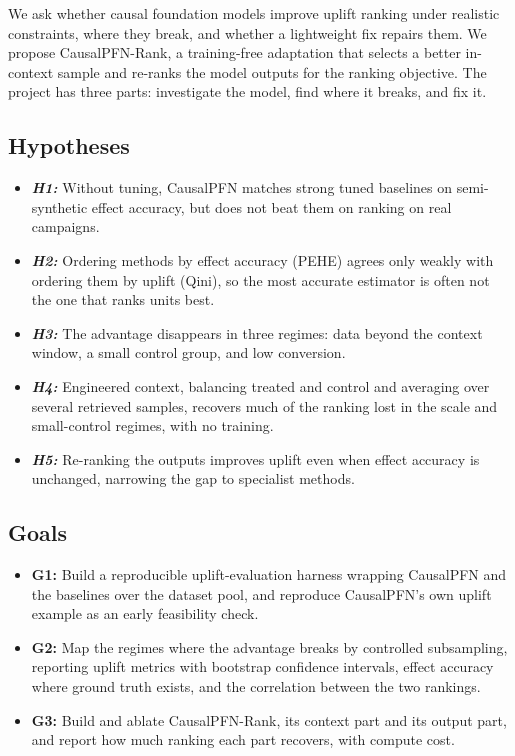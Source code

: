 \documentclass[twocolumn]{style}
\begin{document}
We ask whether causal foundation models improve uplift ranking under realistic constraints, where
they break, and whether a lightweight fix repairs them. We propose CausalPFN-Rank, a training-free
adaptation that selects a better in-context sample and re-ranks the model outputs for the ranking
objective. The project has three parts: investigate the model, find where it breaks, and fix it.

\subsection{Hypotheses}
\begin{itemize}
    \item \textit{\textbf{H1:}} Without tuning, CausalPFN matches strong tuned baselines on
    semi-synthetic effect accuracy, but does not beat them on ranking on real campaigns.
    \item \textit{\textbf{H2:}} Ordering methods by effect accuracy (PEHE) agrees only weakly with
    ordering them by uplift (Qini), so the most accurate estimator is often not the one that ranks
    units best.
    \item \textit{\textbf{H3:}} The advantage disappears in three regimes: data beyond the context
    window, a small control group, and low conversion.
    \item \textit{\textbf{H4:}} Engineered context, balancing treated and control and averaging over
    several retrieved samples, recovers much of the ranking lost in the scale and small-control
    regimes, with no training.
    \item \textit{\textbf{H5:}} Re-ranking the outputs improves uplift even when effect accuracy is
    unchanged, narrowing the gap to specialist methods.
\end{itemize}

\subsection{Goals}
\begin{itemize}
    \item \textbf{G1:} Build a reproducible uplift-evaluation harness wrapping CausalPFN and the
    baselines over the dataset pool, and reproduce CausalPFN's own uplift example as an early
    feasibility check.
    \item \textbf{G2:} Map the regimes where the advantage breaks by controlled subsampling,
    reporting uplift metrics with bootstrap confidence intervals, effect accuracy where ground truth
    exists, and the correlation between the two rankings.
    \item \textbf{G3:} Build and ablate CausalPFN-Rank, its context part and its output part, and
    report how much ranking each part recovers, with compute cost.
\end{itemize}
\end{document}
